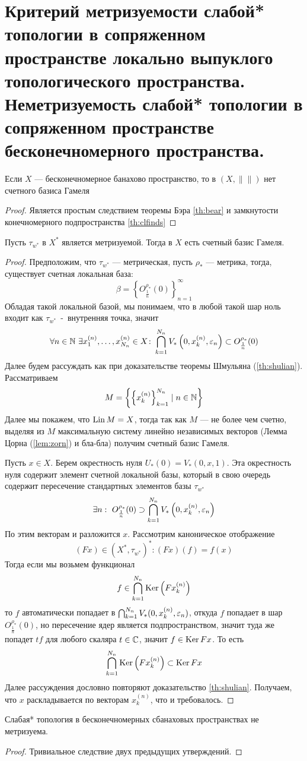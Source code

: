 \newpage
\section{Критерий метризуемости слабой* топологии в сопряженном пространстве локально выпуклого топологического пространства. Неметризуемость слабой* топологии в сопряженном пространстве бесконечномерного пространства.}


\begin{claim}
	Если $X$ --- бесконечномерное банахово пространство, то в $(X, \|\|)$ нет счетного базиса Гамеля
\end{claim}
\begin{proof}
	Является простым следствием теоремы Бэра \ref{th:bear} и замкнутости конечномерного подпространства \ref{th:clfinds}
\end{proof}
\begin{claim}
	Пусть $\tau_{w^*}$ в $X^*$ является метризуемой. Тогда в $X$ есть счетный базис Гамеля.
\end{claim}
\begin{proof}
	Предположим, что $\tau_{w^*}$ --- метрическая, пусть $\rho_*$ --- метрика, тогда, существует счетная локальная база:
	$$
	\beta = \left\{O_{\frac{1}{n}}^{\rho_*}(0)\right\}_{n = 1}^\infty
	$$
	Обладая такой локальной базой, мы понимаем, что в любой такой шар ноль входит как $\tau_{w^*}$~-~внутренняя точка, значит 
	$$
	\forall n \in \mathbb{N} \ \exists x^{(n)}_1, \dots, x^{(n)}_{N_n} \in X \colon \bigcap_{k = 1}^{N_n} V_*\left(0, x_k^{(n)}, \varepsilon_n\right)\subset O_{\frac{1}{n}}^{\rho_*}(0)
	$$
	Далее будем рассуждать как при доказательстве теоремы Шмульяна (\ref{th:shulian}). Рассматриваем 
	$$
	M = \left\{\left\{x_k^{(n)}\right\}_{k=1}^{N_n} \mid n \in \mathbb{N}\right\}
	$$
	Далее мы покажем, что $\operatorname{Lin} M = X$, тогда так как $M$ --- не более чем счетно, выделяя из $M$ максимальную систему линейно независимых векторов (Лемма Цорна (\ref{lem:zorn}) и бла-бла) получим счетный базис Гамеля. 
	
	Пусть $x \in X$. Берем окрестность нуля $U_*(0) = V_*(0,x,1)$. Эта окрестность нуля содержит элемент счетной локальной базы, который в свою очередь содержит пересечение стандартных элементов базы $\tau_{w^*}$
	$$
	\exists n: \  O_{\frac{1}{n}}^{\rho_*}(0) \supset \bigcap_{k = 1}^{N_n} V_*\left(0, x_k^{(n)}, \varepsilon_n\right)
	$$
	По этим векторам и разложится $x$. Рассмотрим каноническое отображение 
	$$(Fx) \in (X^*, \tau_{w^*})^*\colon (Fx)(f) = f(x)$$
	Тогда если мы возьмем функционал 
	$$
	f \in \bigcap_{k=1}^{N_n} \operatorname{Ker} \left(Fx_k^{(n)}\right)
	$$
	то $f$ автоматически попадает в $\bigcap_{k = 1}^{N_n} V_*(0, x_k^{(n)}, \varepsilon_n)$, откуда $f$ попадает в шар $O_{\frac{1}{n}}^{\rho_*}(0)$, но пересечение ядер является подпространством, значит туда же попадет $t f$ для любого скаляра $t \in \mathbb{C}$, значит $f \in \operatorname{Ker} Fx$. То есть 
	$$
	\bigcap_{k=1}^{N_n} \operatorname{Ker} \left(Fx_k^{(n)}\right) \subset \operatorname{Ker} Fx
	$$
	Далее рассуждения дословно повторяют доказательство \ref{th:shulian}. Получаем, что $x$ раскладывается по векторам $x_{k}^{(n)}$, что и требовалось.
\end{proof}
\begin{theorem}
	Слабая* топология в бесконечномерных сбанаховых пространствах не метризуема.
\end{theorem}
\begin{proof}
	Тривиальное следствие двух предыдущих утверждений. 
\end{proof}

